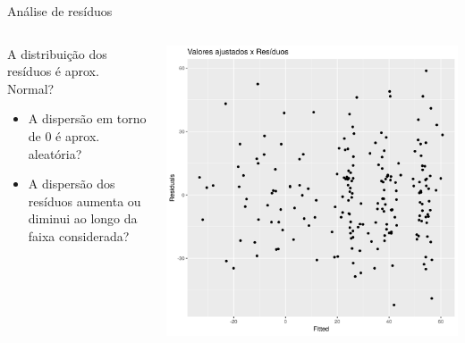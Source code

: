 \documentclass{beamer}
\begin{document}
\begin{frame}{Análise de resíduos}
  \begin{columns}
    \begin{column}{5cm}
      A distribuição dos resíduos é aprox. Normal?
      \bigskip
      \begin{itemize}
        \footnotesize
      \item A dispersão em torno de 0 é aprox. aleatória?
        \bigskip
      \item A dispersão dos resíduos aumenta ou diminui ao longo da faixa considerada?
      \end{itemize}
    \end{column}
    \begin{column}{5cm}
      \begin{center}
        \includegraphics[width=1.1\textwidth]{Cap18-19/pratica-plot-resid}
      \end{center}
    \end{column}
  \end{columns}
\end{frame}
\end{document}
